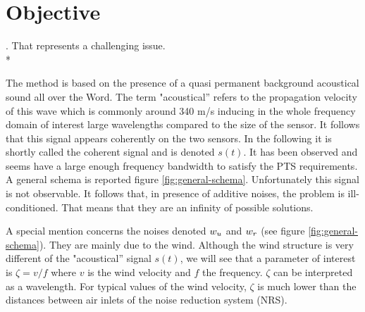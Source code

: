 \section{Objective}

. That represents a challenging issue.\\*

 The method is based on the presence of a quasi permanent background acoustical sound all over the Word. The term "acoustical'' refers to the propagation velocity of this wave which is commonly around 340 m/s inducing in the whole frequency domain of interest large wavelengths compared to the size of the sensor. It follows that this signal appears coherently on the two sensors. In the following it is shortly called the coherent signal and is denoted $s(t)$. It has been observed and seems have a large enough frequency bandwidth to satisfy the PTS requirements. A general schema is reported figure \ref{fig:general-schema}. 
Unfortunately this signal is not observable. It follows that, in presence of additive noises, the problem is ill-conditioned. That means that they are an infinity of possible solutions.

A special mention concerns the noises denoted $w_{{u}}$ and $w_{{r}}$ (see figure \ref{fig:general-schema}). They are mainly due to the wind. Although the wind structure is very different of the  "acoustical'' signal $s(t)$, we will see that a parameter of interest is $\zeta=v/f$ where $v$ is the wind velocity and $f$ the frequency. $\zeta$ can be interpreted 
as a wavelength. For typical values of the wind velocity, $\zeta$ is much lower than the distances between air inlets of the noise reduction system (NRS).

